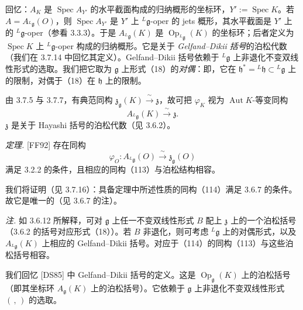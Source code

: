 
回忆：$A_K$ 是 $\operatorname{Spec}A_{Y'}$ 的水平截面构成的归纳概形的坐标环，$Y':=\operatorname{Spec}K$。若 $A=A_{{}^{L}\mathfrak{g}}(O)$，则 $\operatorname{Spec}A_{Y'}$ 是 $Y'$ 上 ${}^{L}\mathfrak{g}$-oper 的 jets 概形，其水平截面是 $Y'$ 上的 ${}^{L}\mathfrak{g}$-oper（参看 3.3.3）。于是 $A_{{}^{L}\mathfrak{g}}(K)$ 是 $\operatorname{Op}_{{}^{L}\mathfrak{g}}(K)$ 的坐标环；后者定义为 $\operatorname{Spec}K$ 上 ${}^{L}\mathfrak{g}$-oper 构成的归纳概形。它是关于 \emph{Gelfand--Dikii 括号}的泊松代数（我们在 3.7.14 中回忆其定义）。Gelfand--Dikii 括号依赖于 ${}^{L}\mathfrak{g}$ 上非退化不变双线性形式的选取。我们把它取为 $\mathfrak{g}$ 上形式（18）的\emph{对偶}：即，它在 $\mathfrak{h}^*={}^{L}\mathfrak{h}\subset{}^{L}\mathfrak{g}$ 上的限制，对偶于（18）在 $\mathfrak{h}$ 上的限制。

由 3.7.5 与 3.7.7，有典范同构 $\mathfrak{z}_{\mathfrak{g}}(K)\xrightarrow{\ \sim\ }\mathfrak{z}$，故可把 $\varphi_K$ 视为 $\operatorname{Aut}K$-等变同构
\begin{equation}\tag{113}
A_{{}^{L}\mathfrak{g}}(K)\xrightarrow{\ \sim\ }\mathfrak{z}.
\end{equation}
$\mathfrak{z}$ 是关于 Hayashi 括号的泊松代数（见 3.6.2）。

 \emph{定理.} [FF92] 存在同构
\begin{equation}\tag{114}
\varphi_O:A_{{}^{L}\mathfrak{g}}(O)\xrightarrow{\ \sim\ }\mathfrak{z}_{\mathfrak{g}}(O)
\end{equation}
满足 3.2.2 的条件，且相应的同构（113）与泊松结构相容。

我们将证明（见 3.7.16）：具备定理中所述性质的同构（114）满足 3.6.7 的条件。故它是唯一的（见 3.6.7 的注）。

\emph{注.} 如 3.6.12 所解释，可对 $\mathfrak{g}$ 上任一不变双线性形式 $B$ 配上 $\mathfrak{z}$ 上的一个泊松括号（3.6.2 的括号对应形式（18））。若 $B$ 非退化，则可考虑 ${}^{L}\mathfrak{g}$ 上的对偶形式，以及 $A_{{}^{L}\mathfrak{g}}(K)$ 上相应的 Gelfand--Dikii 括号。对应于（114）的同构（113）与这些泊松括号相容。


 我们回忆 [DS85] 中 Gelfand--Dikii 括号的定义。这是 $\operatorname{Op}_{\mathfrak{g}}(K)$ 上的泊松括号（即其坐标环 $A_{\mathfrak{g}}(K)$ 上的泊松括号）。它依赖于 $\mathfrak{g}$ 上非退化不变双线性形式 $(\,,\,)$ 的选取。

